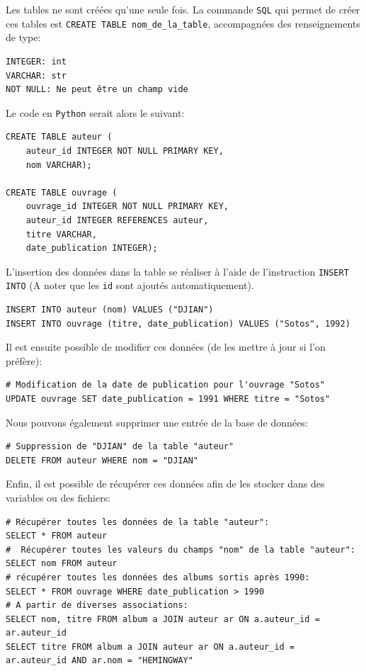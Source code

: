 \documentclass[a4paper,11pt]{book}
\begin{document}
Les tables ne sont créées qu'une seule fois. La commande \texttt{SQL} qui permet de créer ces tables est \texttt{CREATE TABLE nom\_de\_la\_table}, accompagnées des renseignements de type:
\begin{verbatim}
INTEGER: int
VARCHAR: str
NOT NULL: Ne peut être un champ vide
\end{verbatim}
\medskip

Le code en \texttt{Python} serait alors le suivant:
\begin{lstlisting}
CREATE TABLE auteur (
    auteur_id INTEGER NOT NULL PRIMARY KEY, 
    nom VARCHAR);

CREATE TABLE ouvrage (
    ouvrage_id INTEGER NOT NULL PRIMARY KEY,
    auteur_id INTEGER REFERENCES auteur, 
    titre VARCHAR,
    date_publication INTEGER);
\end{lstlisting}
\medskip

L'insertion des données dans la table se réaliser à l'aide de l'instruction \texttt{INSERT INTO} (A noter que les \texttt{id} sont ajoutés automatiquement).
\begin{lstlisting}
INSERT INTO auteur (nom) VALUES ("DJIAN")
INSERT INTO ouvrage (titre, date_publication) VALUES ("Sotos", 1992)
\end{lstlisting}
\medskip

Il est ensuite possible de modifier ces données (de les mettre à jour si l'on préfère):
\begin{lstlisting}
# Modification de la date de publication pour l'ouvrage "Sotos"
UPDATE ouvrage SET date_publication = 1991 WHERE titre = "Sotos"
\end{lstlisting}
\medskip

Nous pouvons également supprimer une entrée de la base de données:
\begin{lstlisting}
# Suppression de "DJIAN" de la table "auteur"
DELETE FROM auteur WHERE nom = "DJIAN"
\end{lstlisting}
\medskip

Enfin, il est possible de récupérer ces données afin de les stocker dans des variables ou des fichiers:
\begin{lstlisting} 
# Récupérer toutes les données de la table "auteur":
SELECT * FROM auteur  
#  Récupérer toutes les valeurs du champs "nom" de la table "auteur":
SELECT nom FROM auteur  
# récupérer toutes les données des albums sortis après 1990:
SELECT * FROM ouvrage WHERE date_publication > 1990 
# A partir de diverses associations: 
SELECT nom, titre FROM album a JOIN auteur ar ON a.auteur_id = 
ar.auteur_id  
SELECT titre FROM album a JOIN auteur ar ON a.auteur_id = 
ar.auteur_id AND ar.nom = "HEMINGWAY"  
\end{lstlisting}
\medskip
\end{document}
